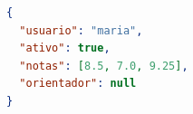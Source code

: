 \begin{codigo}[htbp]
\begin{ilustracao}[\linewidth]{\caption{Resposta de uma API em JSON, com a linguagem definida pelo autor}\label{cod:guia-json}}{\elaboracaopropria}
  \begin{lstlisting}[language=json, numbers=none]
{
  "usuario": "maria",
  "ativo": true,
  "notas": [8.5, 7.0, 9.25],
  "orientador": null
}
  \end{lstlisting}
\end{ilustracao}
\end{codigo}

